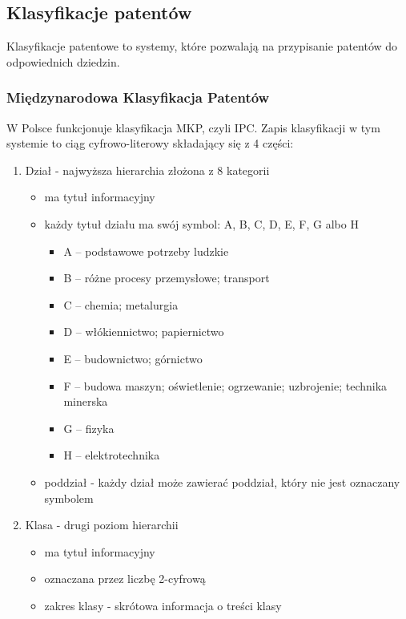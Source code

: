\newpage
\subsection{Klasyfikacje patentów}

Klasyfikacje patentowe to systemy, które pozwalają na przypisanie
patentów do odpowiednich dziedzin.

\subsubsection{Międzynarodowa Klasyfikacja Patentów}

W Polsce funkcjonuje klasyfikacja
\ac{MKP}, czyli \ac{IPC}. Zapis klasyfikacji w tym systemie to ciąg
cyfrowo-literowy składający się z 4 części:

\begin{enumerate}
    \item Dział - najwyższa hierarchia złożona z 8 kategorii
    \begin{itemize}
        \item ma tytuł informacyjny
        \item każdy tytuł działu ma swój symbol: A, B, C, D, E, F, G albo H
        \begin{itemize}
            \item A – podstawowe potrzeby ludzkie
            \item B – różne procesy przemysłowe; transport
            \item C – chemia; metalurgia
            \item D – włókiennictwo; papiernictwo
            \item E – budownictwo; górnictwo
            \item F – budowa maszyn; oświetlenie; ogrzewanie; uzbrojenie; technika minerska
            \item G – fizyka
            \item H – elektrotechnika
        \end{itemize}
        \item poddział - każdy dział może zawierać poddział, który nie jest oznaczany symbolem
    \end{itemize}
    \item Klasa - drugi poziom hierarchii
    \begin{itemize}
        \item ma tytuł informacyjny
        \item oznaczana przez liczbę 2-cyfrową
        \item zakres klasy - skrótowa informacja o treści klasy

\end{itemize}
\end{enumerate}
